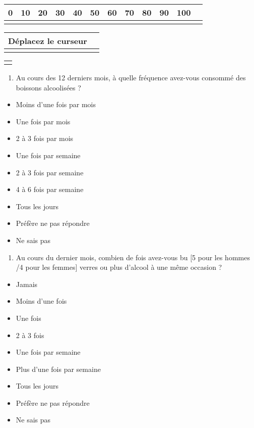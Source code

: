 \documentclass[
  letterpaper,
  DIV=11,
  numbers=noendperiod]{scrreprt}
\providecommand{\tightlist}{%
  \setlength{\itemsep}{0pt}\setlength{\parskip}{0pt}}\usepackage{longtable,booktabs,array}
\begin{document}
\begin{longtable}[]{@{}llllllllllll@{}}
\toprule\noalign{}
0 & 10 & 20 & 30 & 40 & 50 & 60 & 70 & 80 & 90 & 100 & \\
\midrule\noalign{}
\endhead
\bottomrule\noalign{}
\endlastfoot
\end{longtable}

\begin{longtable}[]{@{}ll@{}}
\toprule\noalign{}
Déplacez le curseur & \\
\midrule\noalign{}
\endhead
\bottomrule\noalign{}
\endlastfoot
\end{longtable}

\begin{longtable}[]{@{}l@{}}
\toprule\noalign{}
\endhead
\bottomrule\noalign{}
\endlastfoot
\end{longtable}

\begin{enumerate}
\def\labelenumi{\arabic{enumi}.}
\setcounter{enumi}{53}
\tightlist
\item
  Au cours des 12 derniers mois, à quelle fréquence avez-vous consommé
  des boissons alcoolisées ?
\end{enumerate}

\begin{itemize}
\tightlist
\item
  Moins d'une fois par mois
\item
  Une fois par mois
\item
  2 à 3 fois par mois
\item
  Une fois par semaine
\item
  2 à 3 fois par semaine
\item
  4 à 6 fois par semaine
\item
  Tous les jours
\item
  Préfère ne pas répondre
\item
  Ne sais pas
\end{itemize}

\begin{enumerate}
\def\labelenumi{\arabic{enumi}.}
\setcounter{enumi}{54}
\tightlist
\item
  Au cours du dernier mois, combien de fois avez-vous bu {[}5 pour les
  hommes /4 pour les femmes{]} verres ou plus d'alcool à une même
  occasion ?
\end{enumerate}

\begin{itemize}
\tightlist
\item
  Jamais
\item
  Moins d'une fois
\item
  Une fois
\item
  2 à 3 fois
\item
  Une fois par semaine
\item
  Plus d'une fois par semaine
\item
  Tous les jours
\item
  Préfère ne pas répondre
\item
  Ne sais pas
\end{itemize}
\end{document}
